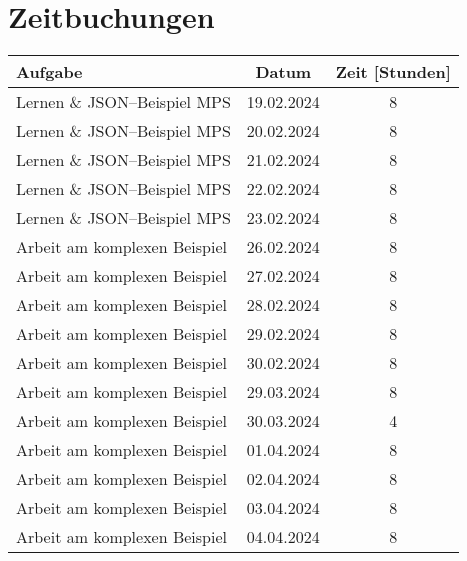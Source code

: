 \appendix


\section{Zeitbuchungen}\label{sec:zeitbuchungen}
\begin{table}[H]
    \centering
    \begin{tabular}{|l|c|c|}
        \hline
        Aufgabe                                & Datum      & Zeit [Stunden] \\
        \hline
        \hline
        Lernen \& \ac{JSON}--Beispiel \ac{MPS} & 19.02.2024 & 8              \\
        \hline
        Lernen \& \ac{JSON}--Beispiel \ac{MPS} & 20.02.2024 & 8              \\
        \hline
        Lernen \& \ac{JSON}--Beispiel \ac{MPS} & 21.02.2024 & 8              \\
        \hline
        Lernen \& \ac{JSON}--Beispiel \ac{MPS} & 22.02.2024 & 8              \\
        \hline
        Lernen \& \ac{JSON}--Beispiel \ac{MPS} & 23.02.2024 & 8              \\
        \hline
        Arbeit am komplexen Beispiel           & 26.02.2024 & 8              \\
        \hline
        Arbeit am komplexen Beispiel           & 27.02.2024 & 8              \\
        \hline
        Arbeit am komplexen Beispiel           & 28.02.2024 & 8              \\
        \hline
        Arbeit am komplexen Beispiel           & 29.02.2024 & 8              \\
        \hline
        Arbeit am komplexen Beispiel           & 30.02.2024 & 8              \\
        \hline
        Arbeit am komplexen Beispiel           & 29.03.2024 & 8              \\
        \hline
        Arbeit am komplexen Beispiel           & 30.03.2024 & 4              \\
        \hline
        Arbeit am komplexen Beispiel           & 01.04.2024 & 8              \\
        \hline
        Arbeit am komplexen Beispiel           & 02.04.2024 & 8              \\
        \hline
        Arbeit am komplexen Beispiel           & 03.04.2024 & 8              \\
        \hline
        Arbeit am komplexen Beispiel           & 04.04.2024 & 8              \\

\end{tabular}
\end{table}
